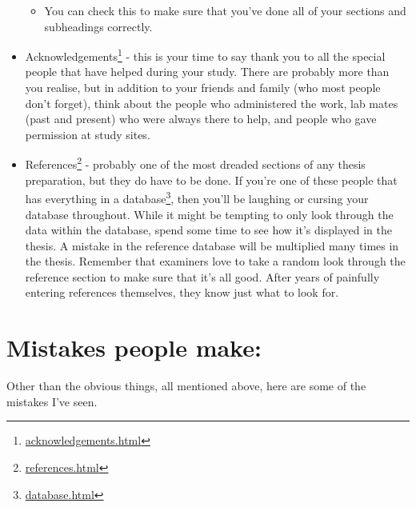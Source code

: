 \documentclass[
]{krantz}
\providecommand{\tightlist}{%
  \setlength{\itemsep}{0pt}\setlength{\parskip}{0pt}}
\renewcommand{\href}[2]{#2\footnote{\url{#1}}}
\begin{document}
\begin{itemize}
  \begin{itemize}
  \tightlist
  \item
    You can check this to make sure that you've done all of your sections and subheadings correctly.
  \end{itemize}
\item
  \href{acknowledgements.html}{Acknowledgements} - this is your time to say thank you to all the special people that have helped during your study. There are probably more than you realise, but in addition to your friends and family (who most people don't forget), think about the people who administered the work, lab mates (past and present) who were always there to help, and people who gave permission at study sites.
\item
  \href{references.html}{References} - probably one of the most dreaded sections of any thesis preparation, but they do have to be done. If you're one of these people that has everything in a \href{database.html}{database}, then you'll be laughing or cursing your database throughout. While it might be tempting to only look through the data within the database, spend some time to see how it's displayed in the thesis. A mistake in the reference database will be multiplied many times in the thesis. Remember that examiners love to take a random look through the reference section to make sure that it's all good. After years of painfully entering references themselves, they know just what to look for.
\end{itemize}

\hypertarget{mistakes-people-make}{%
\section{Mistakes people make:}\label{mistakes-people-make}}

Other than the obvious things, all mentioned above, here are some of the mistakes I've seen.
\end{document}
